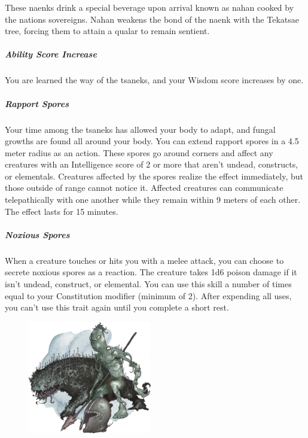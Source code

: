 \begin{linenumbers}
These naenks drink a special beverage upon arrival known as nahan cooked by the nations sovereigns.
Nahan weakens the bond of the naenk with the Tekatsae tree, forcing them to attain a qualar to remain sentient.

\subparagraph{Ability Score Increase} You are learned the way of the tsaneks, and your Wisdom score increases by one.

\subparagraph{Rapport Spores} Your time among the tsaneks has allowed your body to adapt, and fungal growths are found all around your body.
You can extend rapport spores in a 4.5 meter radius as an action.
These spores go around corners and affect any creatures with an Intelligence score of 2 or more that aren't undead, constructs, or elementals.
Creatures affected by the spores realize the effect immediately, but those outside of range cannot notice it.
Affected creatures can communicate telepathically with one another while they remain within 9 meters of each other.
The effect lasts for 15 minutes.

\subparagraph{Noxious Spores} When a creature touches or hits you with a melee attack, you can choose to secrete noxious spores as a reaction.
The creature takes 1d6 poison damage if it isn't undead, construct, or elemental.
You can use this skill a number of times equal to your Constitution modifier (minimum of 2).
After expending all uses, you can't use this trait again until you complete a short rest.

\begin{figure}[!b]
    \centering
    \includegraphics[width=0.48\textwidth]{02kins/img/15naenk_nuen.png}
\end{figure}

\end{linenumbers}

\newpage
